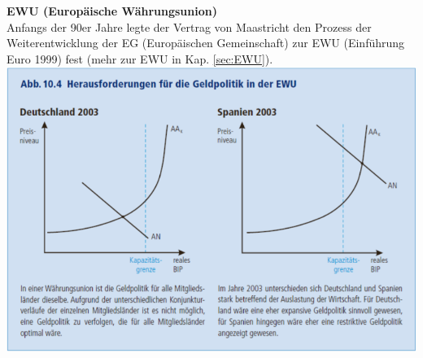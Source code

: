 \begin{multicols}{2}
\textbf{EWU (Europäische Währungsunion)}\\
Anfangs der 90er Jahre legte der Vertrag von Maastricht den Prozess der Weiterentwicklung der EG (Europäischen Gemeinschaft) zur EWU (Einführung Euro 1999) fest (mehr zur EWU in Kap. \ref{sec:EWU}).
\vfill\null
\columnbreak
\includegraphics[width=\linewidth]{images/ewu.png}
\end{multicols}


